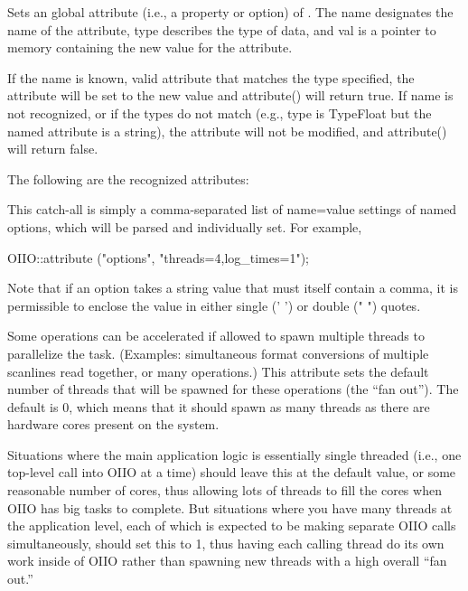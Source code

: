 \label{sec:globalattribute}

Sets an global attribute (i.e., a property or option) of \product.
The {\cf name} designates the name of the attribute, {\cf type}
describes the type of data, and {\cf val} is a pointer to memory 
containing the new value for the attribute.

If the name is known, valid attribute that matches the type specified,
the attribute will be set to the new value and {\cf attribute()} will
return {\cf true}.  If {\cf name} is not recognized, or if the types do
not match (e.g., {\cf type} is {\cf TypeFloat} but the named
attribute is a string), the attribute will not be modified, and {\cf
  attribute()} will return {\cf false}.

\noindent The following are the recognized attributes:

\vspace{10pt}
This catch-all is simply a comma-separated list of {\cf name=value}
settings of named options, which will be parsed and individually set.
For example,
\begin{code}
        OIIO::attribute ("options", "threads=4,log_times=1");
\end{code}
Note that if an option takes a string value that must itself contain a
comma, it is permissible to enclose the value in either single ({\cf ' '})
or double ({\cf " "}) quotes.
\apiend

\vspace{10pt}
 \label{sec:attribute:threads}
Some \product operations can be accelerated if allowed to spawn multiple
threads to parallelize the task.  (Examples: simultaneous format conversions
of multiple scanlines read together, or many \ImageBufAlgo operations.)
This attribute sets the default number of threads that will be spawned
for these operations (the ``fan out'').
The default is 0, which means that it should spawn as many
threads as there are hardware cores present on the system.

Situations where the main application logic is essentially single threaded
(i.e., one top-level call into OIIO at a time) should leave this at the
default value, or some reasonable number of cores, thus allowing lots of
threads to fill the cores when OIIO has big tasks to complete. But
situations where you have many threads at the application level, each of
which is expected to be making separate OIIO calls simultaneously, should
set this to 1, thus having each calling thread do its own work inside of
OIIO rather than spawning new threads with a high overall ``fan out.''
\apiend

